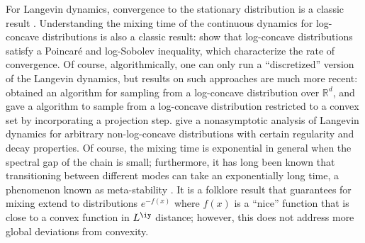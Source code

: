 For Langevin dynamics, convergence to the stationary distribution is a classic result \cite{bhattacharya1978criteria}. Understanding the mixing time of the continuous dynamics for log-concave distributions is also a classic result: \cite{bakry1985diffusions, bakry2008simple} show that log-concave distributions satisfy a Poincar\'e and log-Sobolev inequality, which characterize the rate of convergence. Of course, algorithmically, one can only run a ``discretized'' version of the Langevin dynamics, but results on such approaches are much more recent: \cite{dalalyan2016theoretical, durmus2016high,dalalyan2017further} obtained an algorithm for sampling from a log-concave distribution over $\mathbb{R}^d$, and \cite{bubeck2015sampling} gave a algorithm to sample from a log-concave distribution restricted to a convex set by incorporating a projection step. \cite{raginsky2017non} give a nonasymptotic analysis of Langevin dynamics for arbitrary non-log-concave distributions with certain regularity and decay properties. Of course, the mixing time is exponential in general when the spectral gap of the chain is small; furthermore, it has long been known that transitioning between different modes can take an exponentially long time, a phenomenon known as meta-stability \cite{bovier2002metastability, bovier2004metastability, bovier2005metastability}. It is a folklore result that guarantees for mixing extend to distributions $e^{-f(x)}$ where $f(x)$ is a ``nice'' function that is close to a convex function in $L^\iy$ distance; however, this does not address more global deviations from convexity.




